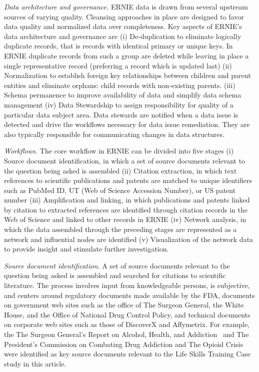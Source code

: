 \documentclass[review]{elsarticle}
\begin{document}
\emph{Data architecture and governance.} ERNIE data is drawn from several upstream sources of varying quality. Cleansing approaches in place are designed to favor data quality and normalized data over completeness. Key aspects of ERNIE's data architecture and governance are (i) De-duplication to eliminate logically duplicate records, that is records with identical primary or unique keys. In ERNIE duplicate records from such a group are deleted while leaving in place a single representative record (preferring a record which is updated last) (ii) Normalization to establish foreign key relationships between children and parent entities and eliminate orphans: child records with non-existing parents. (iii) Schema permanence to improve availability of data and simplify data schema management (iv) Data Stewardship to assign responsibility for quality of a particular data subject area. Data stewards are notified when a data issue is detected and drive the workflows necessary for data issue remediation. They are also typically responsible for communicating changes in data structures.

\emph{Workflows.} The core workflow in ERNIE can be divided into five stages (i) Source document identification, in which a set of source documents relevant to the question being asked is assembled  (ii) Citation extraction, in which text references to scientific publications and patents are matched to unique identifiers such as PubMed ID, UT (Web of Science Accession Number), or US patent number (iii) Amplification and linking, in which publications and patents linked by citation to extracted references are identified through citation records in the Web of Science and linked to other records in ERNIE (iv) Network analysis, in which the data assembled through the preceding stages are represented as a network and influential nodes are identified (v) Visualization of the network data to provide insight and stimulate further investigation.

\emph {Source document identification.} A set of source documents relevant to the question being asked is assembled and searched for citations to scientific literature. The process involves input from knowledgeable persons, is subjective, and centers around regulatory documents made available by the FDA, documents on government web sites such as the office of The Surgeon General, the White House, and the Office of National Drug Control Policy, and technical documents on corporate web sites such as those of DiscoverX and Affymetrix. For example, the The Surgeon General's Report on Alcohol, Health, and Addiction~\cite{SurgGen2017} and The President's Commission on Combating Drug Addiction and The Opioid Crisis~\cite{PresidComm2017} were identified as key source documents relevant to the Life Skills Training Case study in this article. 
\end{document}
